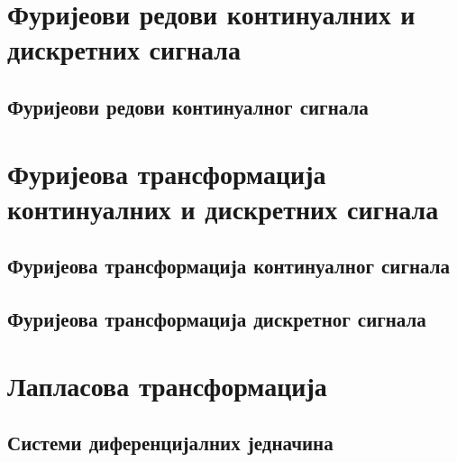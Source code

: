 \setcounter{fid}{0}
\graphicspath{{./1_uvod/2_kontinualni_sistemi/}}
\noindent

\vspace*{\ProblemSep}
\section{Фуријеови редови континуалних и дискретних сигнала}
\subsection{Фуријеови редови континуалног сигнала}

\setcounter{fid}{0}
\graphicspath{{./2_furijeovi_redovi/1_kontinualni/}}
\noindent

\vspace*{\ProblemSep}

\setcounter{fid}{0}
\graphicspath{{./2_furijeovi_redovi/1_kontinualni/}}
\noindent

\vspace*{\ProblemSep}

\setcounter{fid}{0}
\graphicspath{{./2_furijeovi_redovi/1_kontinualni/}}
\noindent

\vspace*{\ProblemSep}
\section{Фуријеова трансформација континуалних и дискретних сигнала}
\subsection{Фуријеова трансформација континуалног сигнала}

\setcounter{fid}{0}
\graphicspath{{./3_furijeove_tranformacije/1_CT/}}
\noindent

\vspace*{\ProblemSep}
\subsection{Фуријеова трансформација дискретног сигнала}
\section{Лапласова трансформација}
\subsection{Системи диференцијалних једначина}

